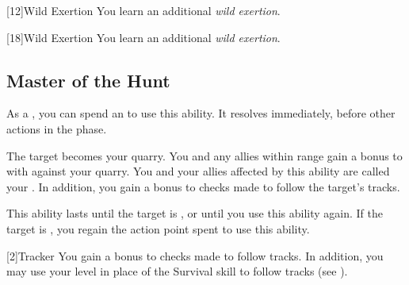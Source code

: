         [12]{Wild Exertion} 
        You learn an additional \textit{wild exertion}.

        [18]{Wild Exertion} 
        You learn an additional \textit{wild exertion}.

    \subsection{Master of the Hunt}

        \label{Quarry}
        As a , you can spend an  to use this ability.
        It resolves immediately, before other actions in the phase.
        \begin{ability}
            \begin{spelltargetinginfo}
            \end{spelltargetinginfo}
            \begin{spelleffects}
                \spelleffect The target becomes your quarry.
                You and any allies within range gain a  bonus to  with  against your quarry.
                You and your allies affected by this ability are called your .
                In addition, you gain a  bonus to checks made to follow the target's tracks.

                This ability lasts until the target is , or until you use this ability again.
                If the target is , you regain the action point spent to use this ability.
            \end{spelleffects}
        \end{ability}

        [2]{Tracker}
        You gain a  bonus to checks made to follow tracks.
        In addition, you may use your level in place of the Survival skill to follow tracks (see ).

